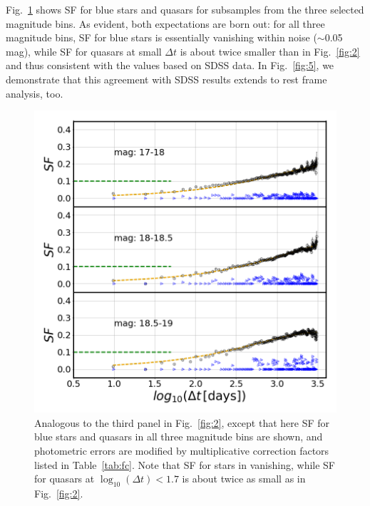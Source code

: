 \documentclass[fleqn,usenatbib]{mnras}
\begin{document}
Fig.~\ref{fig:4} shows SF for blue stars and quasars for subsamples from the three selected magnitude bins. 
As evident, both expectations are born out: for all three magnitude bins, SF for blue stars is essentially 
vanishing within noise ($\sim$0.05 mag), while SF for quasars at small $\Delta t$ is about twice smaller 
than in Fig.~\ref{fig:2} and thus consistent with the values based on SDSS data. In Fig.~\ref{fig:5}, we 
demonstrate that this agreement with SDSS results extends to rest frame analysis, too. 

\begin{figure}
\vskip -0.15in
\includegraphics[width=1.1\columnwidth, center]{Fig_4.png}
\caption{Analogous to the third panel in Fig.~\ref{fig:2}, except that here SF for blue stars and quasars in
all three magnitude bins are shown, and photometric errors are modified by multiplicative correction factors 
listed in Table~\ref{tab:fc}. Note that SF for stars in vanishing, while SF for quasars at $\log_{10}(\Delta t) < 1.7$  
is about twice as small as in Fig.~\ref{fig:2}.} 
\label{fig:4}
\end{figure}
\end{document}
